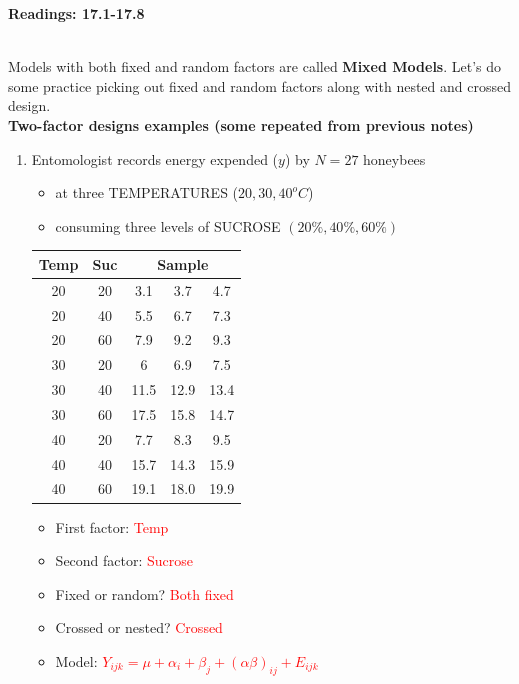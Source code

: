 \begin{center}\large\textbf{Readings: 17.1-17.8}\\
\normalsize \end{center}
\large ~\hrulefill
~\\

Models with both fixed and random factors are called \textbf{Mixed Models}.  Let's do some practice picking out fixed and random factors along with nested and crossed design.\\

\textbf{Two-factor designs examples (some repeated from previous notes)}
\begin{enumerate}
\item Entomologist records energy expended ($y$) by $N=27$ honeybees
\begin{itemize}
\item at three TEMPERATURES ($20,30,40^o C$)
\item consuming three levels of SUCROSE $(20\%,40\%,60\%)$ 
\end{itemize}
 
\begin{large}
\begin{center}
\begin{tabular}{|cc|ccc|}  \hline
Temp & Suc & \multicolumn{3}{c|}{Sample} \\ \hline
   20 & 20 & 3.1 & 3.7 & 4.7 \\
   20 & 40 & 5.5 & 6.7 & 7.3 \\
   20 & 60 & 7.9 & 9.2 & 9.3 \\
   30 & 20 & 6 & 6.9 & 7.5 \\
   30 & 40 & 11.5 & 12.9 & 13.4 \\
   30 & 60 & 17.5 & 15.8 & 14.7 \\
   40 & 20 & 7.7 & 8.3 & 9.5 \\
   40 & 40 & 15.7 & 14.3 & 15.9 \\
   40 & 60 & 19.1 & 18.0 & 19.9 \\ \hline
\end{tabular}
\end{center}
\end{large}

\begin{itemize}
\item First factor: \textcolor{red}{Temp}
\item Second factor: \textcolor{red}{Sucrose}
\item Fixed or random? \textcolor{red}{Both fixed}
\item Crossed or nested? \textcolor{red}{Crossed}
\item Model:  
\textcolor{red}{$Y_{ijk} = \mu + \alpha_i+\beta_j+(\alpha\beta)_{ij} + E_{ijk}$}
\end{itemize}



\end{enumerate}
